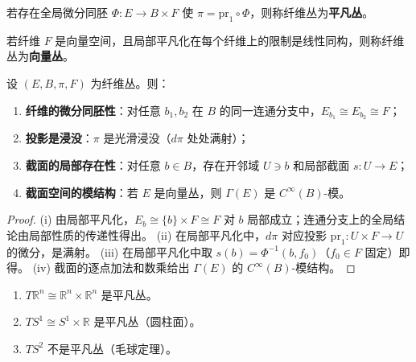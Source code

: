 \begin{definition}[平凡丛]\label{def:trivial_bundle}
若存在全局微分同胚 $\Phi: E \to B \times F$ 使 $\pi = \text{pr}_1 \circ \Phi$，则称纤维丛为\textbf{平凡丛}。
\end{definition}

\begin{definition}[向量丛]\label{def:vector_bundle}
若纤维 $F$ 是向量空间，且局部平凡化在每个纤维上的限制是线性同构，则称纤维丛为\textbf{向量丛}。
\end{definition}

\begin{property}[纤维丛的基本性质]\label{prop:fibre_bundle_properties}
设 $(E, B, \pi, F)$ 为纤维丛。则：
\begin{enumerate}[label=(\roman*)]
    \item \textbf{纤维的微分同胚性}：对任意 $b_1, b_2$ 在 $B$ 的同一连通分支中，$E_{b_1} \cong E_{b_2} \cong F$；
    \item \textbf{投影是浸没}：$\pi$ 是光滑浸没（$d\pi$ 处处满射）；
    \item \textbf{截面的局部存在性}：对任意 $b \in B$，存在开邻域 $U \ni b$ 和局部截面 $s: U \to E$；
    \item \textbf{截面空间的模结构}：若 $E$ 是向量丛，则 $\Gamma(E)$ 是 $C^\infty(B)$-模。
\end{enumerate}
\end{property}

\begin{proof}
(i) 由局部平凡化，$E_b \cong \{b\} \times F \cong F$ 对 $b$ 局部成立；连通分支上的全局结论由局部性质的传递性得出。
(ii) 在局部平凡化中，$d\pi$ 对应投影 $\text{pr}_1: U \times F \to U$ 的微分，是满射。
(iii) 在局部平凡化中取 $s(b) = \Phi^{-1}(b, f_0)$（$f_0 \in F$ 固定）即得。
(iv) 截面的逐点加法和数乘给出 $\Gamma(E)$ 的 $C^\infty(B)$-模结构。
\end{proof}

\begin{example}[平凡丛与非平凡丛]\label{ex:trivial_nontrivial_bundle}
\begin{enumerate}[label=(\roman*)]
    \item $T\mathbb{R}^n \cong \mathbb{R}^n \times \mathbb{R}^n$ 是平凡丛。
    \item $TS^1 \cong S^1 \times \mathbb{R}$ 是平凡丛（圆柱面）。
    \item $TS^2$ 不是平凡丛（毛球定理）。
\end{enumerate}
\end{example}

